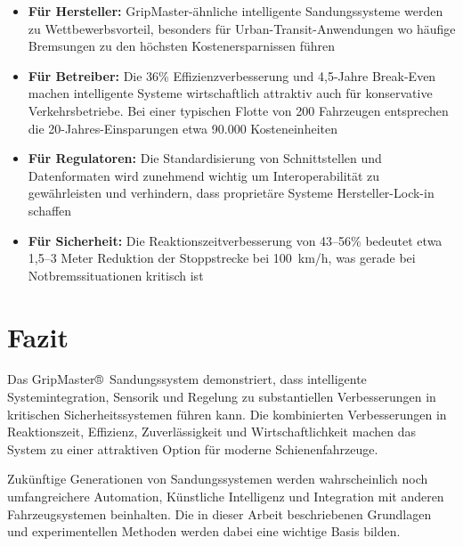 \documentclass[a4paper,12pt]{article}
\theoremstyle{definition}
\theoremstyle{remark}
\begin{document}
\begin{itemize}
	\item \textbf{Für Hersteller:} GripMaster-ähnliche intelligente Sandungssysteme werden zu Wettbewerbsvorteil, besonders für Urban-Transit-Anwendungen wo häufige Bremsungen zu den höchsten Kostenersparnissen führen
	
	\item \textbf{Für Betreiber:} Die 36\% Effizienzverbesserung und 4,5-Jahre Break-Even machen intelligente Systeme wirtschaftlich attraktiv auch für konservative Verkehrsbetriebe. Bei einer typischen Flotte von 200 Fahrzeugen entsprechen die 20-Jahres-Einsparungen etwa 90.000 Kosteneinheiten
	
	\item \textbf{Für Regulatoren:} Die Standardisierung von Schnittstellen und Datenformaten wird zunehmend wichtig um Interoperabilität zu gewährleisten und verhindern, dass proprietäre Systeme Hersteller-Lock-in schaffen
	
	\item \textbf{Für Sicherheit:} Die Reaktionszeitverbesserung von 43--56\% bedeutet etwa 1,5--3 Meter Reduktion der Stoppstrecke bei 100~km/h, was gerade bei Notbremssituationen kritisch ist
\end{itemize}

\section{Fazit}

Das GripMaster®~Sandungssystem demonstriert, dass intelligente Systemintegration, Sensorik und Regelung zu substantiellen Verbesserungen in kritischen Sicherheitssystemen führen kann. Die kombinierten Verbesserungen in Reaktionszeit, Effizienz, Zuverlässigkeit und Wirtschaftlichkeit machen das System zu einer attraktiven Option für moderne Schienenfahrzeuge.


Zukünftige Generationen von Sandungssystemen werden wahrscheinlich noch umfangreichere Automation, Künstliche Intelligenz und Integration mit anderen Fahrzeugsystemen beinhalten. Die in dieser Arbeit beschriebenen Grundlagen und experimentellen Methoden werden dabei eine wichtige Basis bilden.
\end{document}
